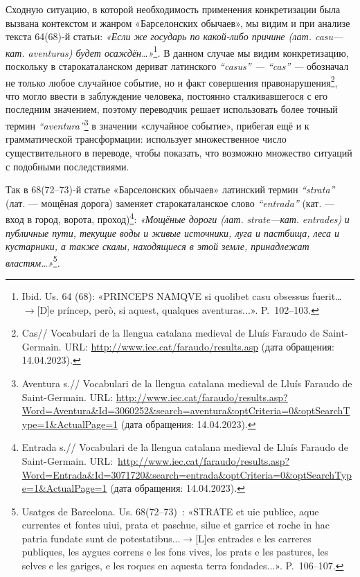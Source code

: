 Сходную ситуацию, в которой необходимость применения конкретизации была вызвана контекстом и жанром «Барселонских обычаев», мы видим и при анализе текста 64(68)-й статьи: \emph{«Если же }\emph{государь по какой-либо причине (лат. casu---кат. aventuras) будет осаждён…»}\footnote{Ibid. Us. 64 (68): «PRINCEPS NAMQVE si quolibet casu obsessus fuerit…$\rightarrow$[D]e príncep, però, si aquest, qualques aventuras...». P.~102--103.}\emph{.} В данном случае мы видим конкретизацию, поскольку в старокаталанском дериват латинского \emph{“}\emph{casus}\emph{” --- “}\emph{cas}\emph{”} \emph{---} обозначал не только любое случайное событие, но и факт совершения правонарушения\footnote{Cas// Vocabulari de la llengua catalana medieval de Lluís Faraudo de Saint-Germain. URL: \url{http://www.iec.cat/faraudo/results.asp} (дата обращения: 14.04.2023).}, что могло ввести в заблуждение человека, постоянно сталкивавшегося с его последним значением, поэтому переводчик решает использовать более точный термин \emph{“}\emph{aventura}\emph{”}\footnote{Aventura s.// Vocabulari de la llengua catalana medieval de Lluís Faraudo de Saint-Germain. URL: \url{http://www.iec.cat/faraudo/results.asp?Word=Aventura&Id=3060252&search=aventura&optCriteria=0&optSearchType=1&ActualPage=1} (дата обращения: 14.04.2023).} в значении «случайное событие», прибегая ещё и к грамматической трансформации: использует множественное число существительного в переводе, чтобы показать, что возможно множество ситуаций с подобными последствиями.

Так в 68(72--73)-й статье «Барселонских обычаев» латинский термин \emph{“strata”} (лат. --- мощёная дорога) заменяет старокаталанское слово \emph{“}\emph{entrada}\emph{”} (кат. --- вход в город, ворота, проход)\footnote{Entrada s.// Vocabulari de la llengua catalana medieval de Lluís Faraudo de Saint-Germain. URL:~\url{http://www.iec.cat/faraudo/results.asp?Word=Entrada&Id=3071720&search=entrada&optCriteria=0&optSearchType=1&ActualPage=1} (дата обращения: 14.04.2023).}: \emph{«Мощёные дороги (лат. }\emph{strat}\emph{e}\emph{---кат.}\emph{ }\emph{entrades}\emph{) }\emph{и публичные пути, текущие воды и живые источники, луга и пастбища, леса и кустарники, а также скалы, находящиеся в этой земле, принадлежат властям…»}\footnote{Usatges de Barcelona. Us. 68(72--73)~: «STRATE et uie publice, aque currentes et fontes uiui, prata et paschue, silue et garrice et roche in hac patria fundate sunt de potestatibus...$\rightarrow$[L]es entrades e les carrercs publiques, les aygues correns e les fons vives, los prats e les pastures, les selves e les gariges, e les roques en aquesta terra fondades...». P.~106--107.}\emph{. }

